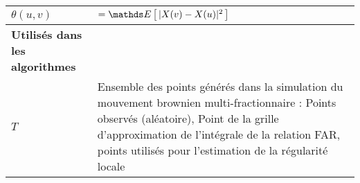 \begin{table}[H]
\begin{tabularx}{\textwidth}{lX}
		$\theta(u,v)$     & $= \esperance{ |X(v) - X(u)|^2 }$                                                                                                                                                               \\
		\toprule
		\textbf{Utilisés dans les algorithmes}                                                                                                                                                                              \\
		\midrule
		$T$               & Ensemble des points générés dans la simulation du mouvement brownien multi-fractionnaire : Points observés (aléatoire), Point de la grille d'approximation de l'intégrale de la relation FAR, points utilisés pour l'estimation de la régularité locale                                                                                                        \\
		\bottomrule
	\end{tabularx}
\end{table}
